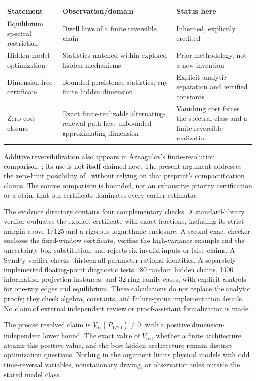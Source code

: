 \documentclass[11pt,a4paper]{article}
\begin{document}
\begin{center}\small
\begin{tabular}{p{.25\linewidth}p{.32\linewidth}p{.33\linewidth}}
\toprule
Statement & Observation/domain & Status here\\\midrule
Equilibrium spectral restriction & Dwell laws of a finite reversible chain & Inherited, explicitly credited\\
Hidden-model optimization & Statistics matched within explored hidden mechanisms & Prior methodology, not a new invention\\
Dimension-free certificate & Bounded persistence statistics; any finite hidden dimension & Explicit analytic separation and certified constants\\
Zero-cost closure & Exact finite-realizable alternating-renewal path law; unbounded approximating dimension & Vanishing cost forces the spectral class and a finite reversible realization\\\bottomrule
\end{tabular}
\end{center}
Additive reversibilization also appears in Aznagulov's finite-resolution comparison~\cite{spectral}; its use is not itself claimed new. The present argument addresses the zero-limit possibility of~\cite{aznagulov} without relying on that preprint's compactification claims. The source comparison is bounded, not an exhaustive priority certification or a claim that our certificate dominates every earlier estimator.

The evidence directory contains four complementary checks. A standard-library verifier evaluates the explicit certificate with exact fractions, including its strict margin above $1/125$ and a rigorous logarithmic enclosure. A second exact checker encloses the fixed-window certificate, verifies the high-variance example and the uncertainty-box substitution, and rejects six invalid inputs or false claims. A SymPy verifier checks thirteen all-parameter rational identities. A separately implemented floating-point diagnostic tests 180 random hidden chains, 1000 information-projection instances, and 32 ring-family cases, with explicit controls for one-way edges and equilibrium. These calculations do not replace the analytic proofs; they check algebra, constants, and failure-prone implementation details. No claim of external independent review or proof-assistant formalization is made.

The precise resolved claim is $V_\infty(P_{1/20})\ne0$, with a positive dimension-independent lower bound. The exact value of $V_\infty$, whether a finite architecture attains this positive value, and the best hidden architecture remain distinct optimization questions. Nothing in the argument limits physical models with odd time-reversal variables, nonstationary driving, or observation rules outside the stated model class.
\end{document}
